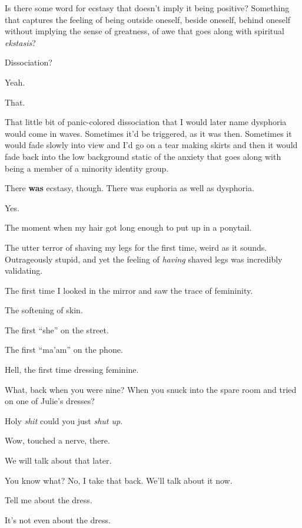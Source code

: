 Is there some word for ecstasy that doesn't imply it being positive? Something that captures the feeling of being outside oneself, beside oneself, behind oneself without implying the sense of greatness, of awe that goes along with spiritual \emph{ekstasis}?

\begin{ally}
Dissociation?
\end{ally}
Yeah.

That.

That little bit of panic-colored dissociation that I would later name dysphoria would come in waves. Sometimes it'd be triggered, as it was then. Sometimes it would fade slowly into view and I'd go on a tear making skirts and then it would fade back into the low background static of the anxiety that goes along with being a member of a minority identity group.

\begin{ally}
There \textbf{was} ecstasy, though. There was euphoria as well as dysphoria.
\end{ally}
Yes.

The moment when my hair got long enough to put up in a ponytail.

The utter terror of shaving my legs for the first time, weird as it sounds. Outrageously stupid, and yet the feeling of \emph{having} shaved legs was incredibly validating.

The first time I looked in the mirror and saw the trace of femininity.

The softening of skin.

The first ``she'' on the street.

The first ``ma'am'' on the phone.

Hell, the first time dressing feminine.

\begin{ally}
What, back when you were nine? When you snuck into the spare room and tried on one of Julie's dresses?
\end{ally}
Holy \emph{shit} could you just \emph{shut up}.

\begin{ally}
Wow, touched a nerve, there.
\end{ally}
We will talk about that later.
\newpage

You know what? No, I take that back. We'll talk about it now.

\begin{ally}
Tell me about the dress.
\end{ally}
It's not even about the dress.
\newpage
